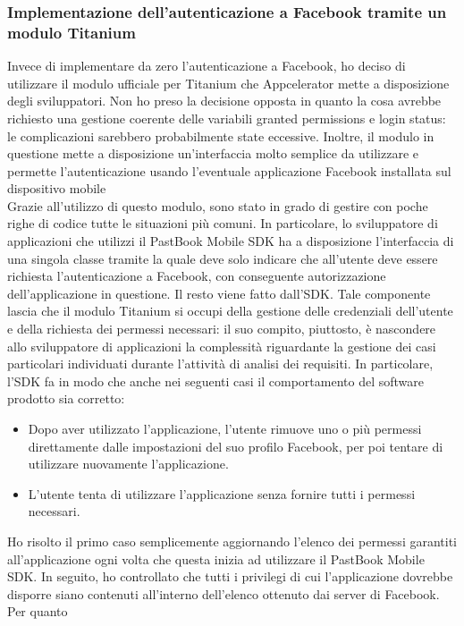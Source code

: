 			\subsubsection{Implementazione dell'autenticazione a Facebook tramite un modulo Titanium}
				Invece di implementare da zero l'autenticazione a Facebook, ho deciso di utilizzare il modulo ufficiale per Titanium
				che Appcelerator mette a disposizione degli sviluppatori. Non ho preso la decisione opposta in quanto la cosa
				avrebbe richiesto una gestione coerente delle variabili granted permissions e login status: le complicazioni
				sarebbero probabilmente state eccessive. Inoltre, il modulo in questione mette a disposizione un'interfaccia
				molto semplice da utilizzare e permette l'autenticazione usando l'eventuale applicazione Facebook installata sul
				dispositivo mobile\\
				Grazie all'utilizzo di questo modulo, sono stato in grado di gestire con poche righe di codice tutte le situazioni più
				comuni. In particolare, lo sviluppatore di applicazioni che utilizzi il PastBook Mobile SDK ha a disposizione
				l'interfaccia di una singola classe tramite la quale deve solo indicare che all'utente deve essere richiesta
				l'autenticazione a Facebook, con conseguente autorizzazione dell'applicazione in questione. Il resto viene fatto
				dall'SDK. Tale componente lascia che il modulo Titanium si occupi della gestione delle credenziali dell'utente e
				della richiesta dei permessi necessari: il suo compito, piuttosto, è nascondere allo sviluppatore di
				applicazioni la complessità riguardante la gestione dei casi particolari individuati durante l'attività di analisi
				dei requisiti. In particolare, l'SDK fa in modo che anche nei seguenti casi il comportamento del software prodotto
				sia corretto:
				\begin{itemize}
					\item Dopo aver utilizzato l'applicazione, l'utente rimuove uno o più permessi direttamente dalle
					impostazioni del suo profilo Facebook, per poi tentare di utilizzare nuovamente l'applicazione.
					\item L'utente tenta di utilizzare l'applicazione senza fornire tutti i permessi necessari.
				\end{itemize}
				Ho risolto il primo caso semplicemente aggiornando l'elenco dei permessi garantiti all'applicazione ogni volta che
				questa inizia ad utilizzare il PastBook Mobile SDK. In seguito, ho controllato che tutti i privilegi di cui
				l'applicazione dovrebbe disporre siano contenuti all'interno dell'elenco ottenuto dai server di Facebook. Per quanto
